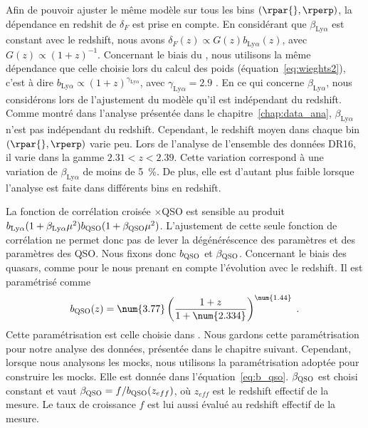 Afin de pouvoir ajuster le même modèle sur tous les bins $(\rpar{}, \rperp)$, la dépendance en redshit de $\delta_F$ est prise en compte.
En considérant que $\beta_{\mathrm{Ly}\alpha}$ est constant avec le redshift, nous avons $\delta_F(z) \propto G(z) b_{\mathrm{Ly}\alpha}(z)$, avec $G(z) \propto (1+z)^{-1}$.
Concernant le biais du \lya{}, nous utilisons la même dépendance que celle choisie lors du calcul des poids (équation~\ref{eq:wieghts2}), c'est à dire $b_{\mathrm{Ly}\alpha} \propto (1+z)^{\gamma_{\mathrm{Ly}\alpha}}$, avec $\gamma_{\mathrm{Ly}\alpha} = 2.9$ \autocite{McDonald2004}.
En ce qui concerne $\beta_{\mathrm{Ly}\alpha}$, nous considérons lors de l'ajustement du modèle qu'il est indépendant du redshift. Comme montré dans l'analyse présentée dans le chapitre~\ref{chap:data_ana}, $\beta_{\mathrm{Ly}\alpha}$ n'est pas indépendant du redshift. Cependant, le redshift moyen dans chaque bin $(\rpar{}, \rperp)$ varie peu. Lors de l'analyse de l'ensemble des données DR16, il varie dans la gamme $\num{2.31} < z < \num{2.39}$. Cette variation correspond à une variation de $\beta_{\mathrm{Ly}\alpha}$ de moins de \SI{5}{\percent}. De plus, elle est d'autant plus faible lorsque l'analyse est faite dans différents bins en redshift.

La fonction de corrélation croisée \lya{}$\times$QSO est sensible au produit $b_{\mathrm{Ly}\alpha}(1+\beta_{\mathrm{Ly}\alpha} \mu^2) b_{\textsc{QSO}}(1+\beta_{\textsc{QSO}} \mu^2)$.
L'ajustement de cette seule fonction de corrélation ne permet donc pas de lever la dégénéréscence des paramètres \lya{} et des paramètres des QSO.
Nous fixons donc $b_{\textsc{QSO}}$ et $\beta_{\textsc{QSO}}$. Concernant le biais des quasars, comme pour le \lya{} nous prenant en compte l'évolution avec le redshift. Il est paramétrisé comme
\begin{equation}
  b_{\textsc{QSO}}(z) = \num{3.77} \left( \frac{1 + z}{1+\num{2.334}} \right)^{\num{1.44}} \; . 
\end{equation}
Cette paramétrisation est celle choisie dans \textcite{DuMasdesBourboux2020}. Nous gardons cette paramétrisation pour notre analyse des données, présentée dans le chapitre suivant. Cependant, lorsque nous analysons les mocks, nous utilisons la paramétrisation adoptée pour construire les mocks. Elle est donnée dans l'équation~\ref{eq:b_qso}.
  $\beta_{\textsc{QSO}}$ est choisi constant et vaut $\beta_{\textsc{QSO}} = f / b_{\textsc{QSO}}(z_{eff})$, où $z_{eff}$ est le redshift effectif de la mesure.
  Le taux de croissance $f$ est lui aussi évalué au redshift effectif de la mesure.



